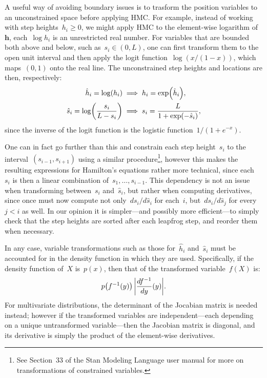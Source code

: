 \documentclass[11pt,a4paper]{article}
\newcommand\ub[1]{\symbf{#1}}                    %
\DeclarePairedDelimiter\lr{\lparen}{\rparen}     %
\DeclarePairedDelimiter\abs{\lvert}{\rvert}      %
\theoremstyle{definition}
\begin{document}
A useful way of avoiding boundary issues is to trasform the position variables
to an unconstrained space before applying HMC. For example, instead of working
with step heights~$h_i \ge 0$, we might apply HMC to the element-wise logarithm
of~$\ub{h}$, each~$\log h_i$ is an unrestricted real number. For variables that
are bounded both above and below, such as~$s_i \in (0,L)$, one can first
transform them to the open unit interval and then apply the logit
function~$\log(x/(1-x))$, which maps~$(0,1)$ onto the real line. The
unconstrained step heights and locations are then, respectively:
\begin{equation}\label{eqn:transform}
\begin{aligned}
  \hat{h}_i = \log(h_i)
    &\implies h_i = \exp\lr*{\hat{h}_i}, \\
  \hat{s}_i = \log\lr*{\frac{s_i}{L-s_i}}
    &\implies s_i = \frac{L}{1+\exp\lr*{-\hat{s}_i}},
\end{aligned}
\end{equation}
since the inverse of the logit function is the logistic function~$1/(1+e^{-x})$.

One can in fact go further than this and constrain each step height~$s_i$ to the
interval~$(s_{i-1},s_{i+1})$ using a similar procedure\footnote{See Section~33
of the Stan Modeling Language user manual for more on transformations of
constrained variables.}, however this makes the resulting expressions for
Hamilton's equations rather more technical, since each~$s_i$ is then a linear
combination of~$s_1,\dots,s_{i-1}$. This dependency is not an issue when
transforming between~$s_i$ and~$\hat{s}_i$, but rather when computing
derivatives, since once must now compute not only~$ds_i/d\hat{s}_i$ for
each~$i$, but~$ds_i/d\hat{s}_j$ for every~$j < i$ as well. In our opinion it is
simpler---and possibly more efficient---to simply check that the step heights
are sorted after each leapfrog step, and reorder them when necessary.

In any case, variable transformations such as those for~$\hat{h}_i$
and~$\hat{s}_i$ must be accounted for in the density function in which they are
used. Specifically, if the density function of~$X$ is~$p(x)$, then that of the
transformed variable~$f(X)$ is:
\[ p\lr*{f^{-1}(y)}\, \abs*{\frac{df^{-1}}{dy}(y)}. \]
For multivariate distributions, the determinant of the Jocabian matrix is needed
instead; however if the transformed variables are independent---each depending
on a unique untransformed variable---then the Jacobian matrix is diagonal, and
its derivative is simply the product of the element-wise derivatives.
\end{document}

